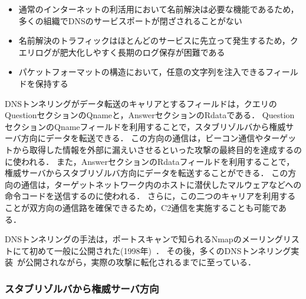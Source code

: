 \begin{itemize}
 \setlength{\itemsep}{0pt}
 \item 通常のインターネットの利活用において名前解決は必要な機能であるため，多くの組織でDNSのサービスポートが閉ざされることがない
 \item 名前解決のトラフィックはほとんどのサービスに先立って発生するため，クエリログが肥大化しやすく長期のログ保存が困難である
 \item パケットフォーマットの構造において，任意の文字列を注入できるフィールドを保持する
\end{itemize}

DNSトンネリングがデータ転送のキャリアとするフィールドは，クエリのQuestionセクションのQnameと，AnswerセクションのRdataである．
QuestionセクションのQnameフィールドを利用することで，スタブリゾルバから権威サーバ方向にデータを転送できる．
この方向の通信は，ビーコン通信やターゲットから取得した情報を外部に漏えいさせるといった攻撃の最終目的を達成するのに使われる．
また，AnswerセクションのRdataフィールドを利用することで，権威サーバからスタブリゾルバ方向にデータを転送することができる．
この方向の通信は，ターゲットネットワーク内のホストに潜伏したマルウェアなどへの命令コードを送信するのに使われる．
さらに，この二つのキャリアを利用することが双方向の通信路を確保できるため，C2通信を実施することも可能である．

DNSトンネリングの手法は，ポートスキャンで知られるNmapのメーリングリストにて初めて一般に公開された(1998年)~\cite{nmap}．
その後，多くのDNSトンネリング実装~\cite{ozymandns, iodine, dnscat2, tcp-over-dns, dnscat, denise, dns-shell, dnsbotnet, dnscapy, dohtunnel, godoh, dohc2, magictunnelandroid, dns2tcp, tuns}が公開されながら，実際の攻撃に転化されるまでに至っている．


\subsubsection{スタブリゾルバから権威サーバ方向}
\label{sec:dns-exfiltration}

